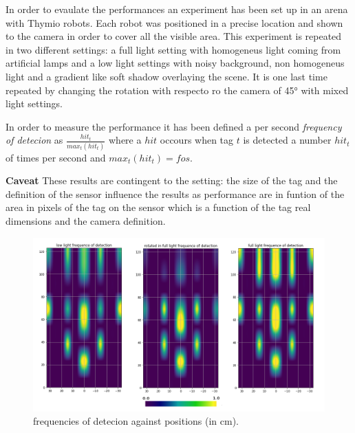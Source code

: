 \documentclass[a4paper]{report}
\begin{document}
In order to evaulate the performances an experiment has been set up in an arena with Thymio robots. Each robot was positioned in a precise location and shown to the camera in order to cover all the visible area. This experiment is repeated in two different settings: a full light setting with homogeneus light coming from artificial lamps and a low light settings with noisy background, non homogeneus light and a gradient like soft shadow overlaying the scene. It is one last time repeated by changing the rotation with respecto ro the camera of 45° with mixed light settings.

In order to measure the performance it has been defined a per second \textit{frequency of detecion} as $\frac{hit_t}{max_t(hit_t)} $ where a $hit$ occours when tag $t$ is detected a number $hit_t$ of times per second and ${max_t(hit_t)}=fos$.

\textbf{Caveat}
These results are contingent to the setting: the size of the tag and the definition of the sensor influence the results as performance are in funtion of the area in pixels of the tag on the sensor which is a function of the tag real dimensions and the camera definition.


\begin{figure}[H]
    \centering
    \includegraphics[width=1.0\textwidth]{heat.png}
    \caption{frequencies of detecion against positions (in cm).}
    \label{fig:freq_hit}
\end{figure}
\end{document}
